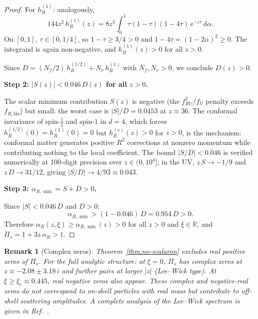 \documentclass[12pt,a4paper]{article}
\newtheorem{remark}[theorem]{Remark}
\newcommand{\Pis}{\Pi_{s}}
\newcommand{\alphaR}{\alpha_R}
\newcommand{\half}{\tfrac{1}{2}}
\newcommand{\dd}{\mathrm{d}}
\newcommand{\ee}{\mathrm{e}}
\begin{document}
\begin{proof}
For $h_R^{(1)}$: analogously,
\begin{equation}\label{eq:h-integral}
  144z^2\,h_R^{(1)}(z)
  = 8z^3\!\int_0^1\!\tau(1\!-\!\tau)(1\!-\!4\tau)\,\ee^{-z\tau}\,\dd\alpha.
\end{equation}
On $[0,1]$, $\tau \in [0, 1/4]$, so $1-\tau \geq 3/4 > 0$ and
$1-4\tau = (1-2\alpha)^2 \geq 0$. The integrand is again non-negative,
and $h_R^{(1)}(z) > 0$ for all $z > 0$.

Since $D = (N_f/2)\,h_R^{(1/2)} + N_v\,h_R^{(1)}$ with $N_f, N_v > 0$,
we conclude $D(z) > 0$.

\medskip\noindent\textbf{Step 2: $|S(z)| < 0.046\,D(z)$ for all $z > 0$.}

The scalar minimum contribution $S(z)$ is negative
(the $f_{RU}^2/f_U$ penalty exceeds $f_{R,\mathrm{bis}}$) but small:
the worst case is $|S|/D = 0.0453$ at $z \approx 36$. The conformal
invariance of spin-$\half$ and spin-$1$ in $d = 4$, which forces
$h_R^{(1/2)}(0) = h_R^{(1)}(0) = 0$ but $h_R^{(s)}(z) > 0$ for $z > 0$,
is the mechanism: conformal matter generates positive $R^2$ corrections
at nonzero momentum while contributing nothing to the local coefficient.
The bound $|S/D| < 0.046$ is verified numerically at 100-digit precision
over $z \in (0, 10^4]$; in the UV, $z\,S \to -1/9$ and $z\,D \to 31/12$,
giving $|S/D| \to 4/93 \approx 0.043$.

\medskip\noindent\textbf{Step 3: $\alpha_{R,\min} = S + D > 0$.}

Since $|S| < 0.046\,D$ and $D > 0$:
\begin{equation}
  \alpha_{R,\min} > (1 - 0.046)\,D = 0.954\,D > 0.
\end{equation}
Therefore $\alphaR(z,\xi) \geq \alpha_{R,\min}(z) > 0$ for all $z > 0$
and $\xi \in \mathbb{R}$, and $\Pis = 1 + 3z\,\alphaR > 1$.
\end{proof}

\begin{remark}[Complex zeros]
Theorem~\ref{thm:no-scalaron} excludes real positive zeros of $\Pis$.
For the full analytic structure: at $\xi = 0$, $\Pis$ has complex
zeros at $z \approx -2.08 \pm 3.18\,i$ and further pairs at larger
$|z|$ (Lee--Wick type). At $\xi \geq \xi_c \approx 0.445$, real
negative zeros also appear. These complex and negative-real zeros
do not correspond to on-shell particles with real mass but contribute
to off-shell scattering amplitudes. A complete analysis of the
Lee--Wick spectrum is given in Ref.~\cite{Alfyorov2025a}.
\end{remark}
\end{document}
